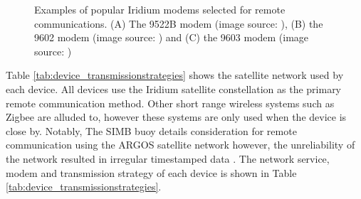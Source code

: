 \begin{figure}[H]
	\centering
	\begin{subfigure}[b]{0.3\textwidth}
	\end{subfigure}%
	\hfill
	\begin{subfigure}[b]{0.3\textwidth}
	\end{subfigure}%
	\hfill
	\begin{subfigure}[b]{0.3\textwidth}
	\end{subfigure}%
	\hfill
	\caption{Examples of popular Iridium modems selected for remote communications. (A) The 9522B modem (image source: \cite{9522B}), (B) the 9602 modem  (image source: \cite{9602}) and (C) the 9603 modem (image source: \cite{9603})} 
	\label{fig:irid_modem}
\end{figure}

Table \ref{tab:device_transmissionstrategies} shows the satellite network used by each device. All devices use the Iridium satellite constellation as the primary remote communication method. Other short range wireless systems such as Zigbee \cite{guimaraes2018surface} are alluded to, however these systems are only used when the device is close by. Notably, The SIMB buoy details consideration for remote communication using the ARGOS satellite network however, the unreliability of the network resulted in irregular timestamped data \cite{planck2019evolution}. The network service, modem and transmission strategy of each device is shown in Table \ref{tab:device_transmissionstrategies}.


